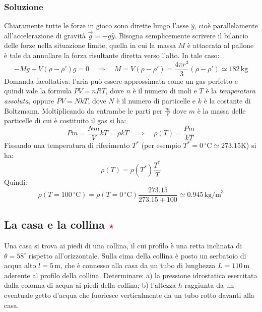\documentclass[12pt,a4paper]{book}
\newcommand{\rstar}{ \textcolor{red}{$\star$}}
\begin{document}
\subsubsection*{Soluzione}
Chiaramente tutte le forze in gioco sono dirette lungo l'asse $\hat{y}$, cioè parallelamente all'accelerazione di gravità $\vec{g}=-g \hat{y}$. 
Bisogna semplicemente scrivere il bilancio delle forze nella situazione limite, quella in cui la massa $M$ è attaccata al pallone
è tale da annullare la forza risultante diretta verso l'alto. In tale caso:
\begin{equation*}
-Mg+V(\rho-\rho')g=0 \quad \Rightarrow \quad M=V(\rho-\rho')=\frac{4 \pi r^3}{3}(\rho-\rho') \simeq 182 \, \text{kg}
\end{equation*}
Domanda facoltativa: l'aria può essere approssimata come un gas perfetto e quindi vale la formula $PV=nRT$, 
dove $n$ è il numero di moli e $T$ è la \textit{temperatura assoluta}, oppure $PV=NkT$, dove $N$ è il numero di particelle e $k$ è la costante di Boltzmann. Moltiplicando da entrambe le parti per $\frac{m}{V}$ dove $m$ è la massa delle particelle di cui è costituito il gas si ha:
\begin{equation*}
Pm=\frac{Nm}{V}kT = \rho k T \quad \Rightarrow \quad \rho(T)=\frac{Pm}{kT}
\end{equation*}
Fissando una temperatura di riferimento $T^*$ (per esempio $T^*=0 \,^{\circ}$C$\simeq273.15$K) si ha:
\begin{equation*}
\rho(T)=\rho(T^*) \frac{T^*}{T}
\end{equation*}
Quindi: 
\begin{equation*}
\rho(T=100 \, ^{\circ}\text{C})=\rho(T=0 \, ^{\circ}\text{C}) \frac{273.15}{273.15+100} \simeq 0.945 \, \text{kg/m}^3
\end{equation*}


\subsection{La casa e la collina \rstar}
Una casa si trova ai piedi di una collina, il cui profilo è una retta inclinata di $\theta=58^{\circ}$
rispetto all'orizzontale. Sulla cima della collina è posto un serbatoio di acqua alto $l=5 \,$m, 
che è connesso alla casa da un tubo di lunghezza $L=110 \,$m aderente al profilo della collina. 
Determinare:
a) la pressione idrostatica esercitata dalla colonna di acqua ai piedi della collina; 
b) l'altezza $h$ raggiunta da un eventuale getto d'acqua che fuoriesce verticalmente da un tubo rotto davanti alla casa. 
\end{document}
